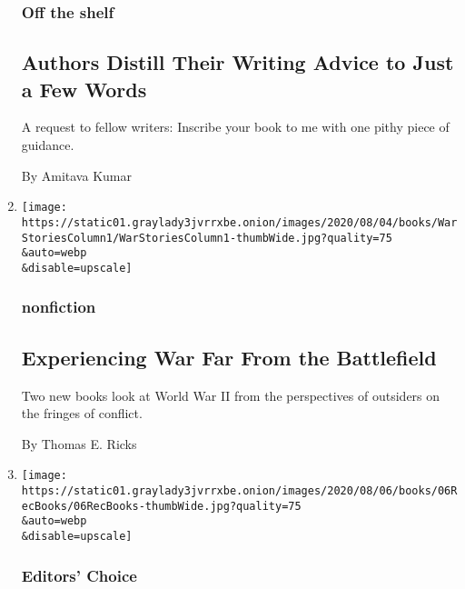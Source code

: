 \begin{enumerate}
{  \subsubsection{Off the shelf}\label{off-the-shelf}}

  \hypertarget{authors-distill-their-writing-advice-to-just-a-few-words}{%
  \subsection{Authors Distill Their Writing Advice to Just a Few
  Words}\label{authors-distill-their-writing-advice-to-just-a-few-words}}

  A request to fellow writers: Inscribe your book to me with one pithy
  piece of guidance.

  By Amitava Kumar
\item
  \href{/2020/08/06/books/review/eileen-alexander-love-in-the-blitz-james-nolan-jr-atomic-doctors.html}{}

  \texttt{[image: https://static01.graylady3jvrrxbe.onion/images/2020/08/04/books/WarStoriesColumn1/WarStoriesColumn1-thumbWide.jpg?quality=75\\\&auto=webp\\\&disable=upscale]}

  \hypertarget{nonfiction-1}{%
  \subsubsection{nonfiction}\label{nonfiction-1}}

  \hypertarget{experiencing-war-far-from-the-battlefield}{%
  \subsection{Experiencing War Far From the
  Battlefield}\label{experiencing-war-far-from-the-battlefield}}

  Two new books look at World War II from the perspectives of outsiders
  on the fringes of conflict.

  By Thomas E. Ricks
\item
  \href{/2020/08/06/books/review/9-new-books-we-recommend-this-week.html}{}

  \texttt{[image: https://static01.graylady3jvrrxbe.onion/images/2020/08/06/books/06RecBooks/06RecBooks-thumbWide.jpg?quality=75\\\&auto=webp\\\&disable=upscale]}

  \hypertarget{editors-choice}{%
  \subsubsection{Editors' Choice}\label{editors-choice}}


\end{enumerate}
